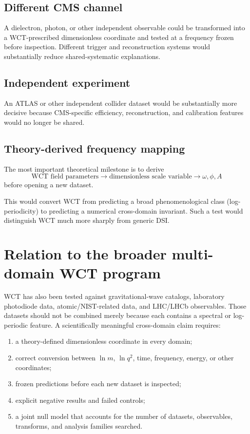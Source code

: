 \documentclass[11pt]{article}
\begin{document}
\subsection{Different CMS channel}

A dielectron, photon, or other independent observable could be transformed
into a WCT-prescribed dimensionless coordinate and tested at a frequency
frozen before inspection.  Different trigger and reconstruction systems would
substantially reduce shared-systematic explanations.

\subsection{Independent experiment}

An ATLAS or other independent collider dataset would be substantially more
decisive because CMS-specific efficiency, reconstruction, and calibration
features would no longer be shared.

\subsection{Theory-derived frequency mapping}

The most important theoretical milestone is to derive
\begin{equation}
\boxed{
\text{WCT field parameters}
\longrightarrow
\text{dimensionless scale variable}
\longrightarrow
\omega,\phi,A
}
\end{equation}
before opening a new dataset.

This would convert WCT from predicting a broad phenomenological class
(log-periodicity) to predicting a numerical cross-domain invariant.  Such a
test would distinguish WCT much more sharply from generic DSI.

\section{Relation to the broader multi-domain WCT program}

WCT has also been tested against gravitational-wave catalogs, laboratory
photodiode data, atomic/NIST-related data, and LHC/LHCb observables.  Those
datasets should not be combined merely because each contains a spectral or
log-periodic feature.  A scientifically meaningful cross-domain claim
requires:
\begin{enumerate}
    \item a theory-defined dimensionless coordinate in every domain;
    \item correct conversion between \(\ln m\), \(\ln q^2\), time, frequency,
          energy, or other coordinates;
    \item frozen predictions before each new dataset is inspected;
    \item explicit negative results and failed controls;
    \item a joint null model that accounts for the number of datasets,
          observables, transforms, and analysis families searched.
\end{enumerate}
\end{document}
